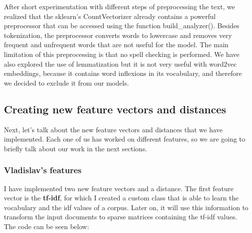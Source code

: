 \documentclass[11pt,a4paper]{article}
\begin{document}
After short experimentation with different steps of preprocessing the text, we realized that the sklearn's CountVectorizer already contains a powerful preprocessor that can be accessed using the function build\_analyzer(). Besides tokenization, the preprocessor converts words to lowercase and removes very frequent and unfrequent words that are not useful for the model. The main limitation of this preprocessing is that no spell checking is performed. We have also explored the use of lemmatization but it is not very useful with word2vec embeddings, because it contains word inflexions in its vocabulary, and therefore we decided to exclude it from our models.

\subsection{Creating new feature vectors and distances}

Next, let's talk about the new feature vectors and distances that we have implemented.
Each one of us has worked on different features, so we are going to briefly talk about
our work in the next sections.

\subsubsection{Vladislav's features}

I have implemented two new feature vectors and a distance. The first feature vector
is the \textbf{tf-idf}, for which I created a custom class that is able to learn the
vocabulary and the idf values of a corpus. Later on, it will use this
information to transform the input documents to sparse matrices containing the
tf-idf values. The code can be seen below:
\end{document}
